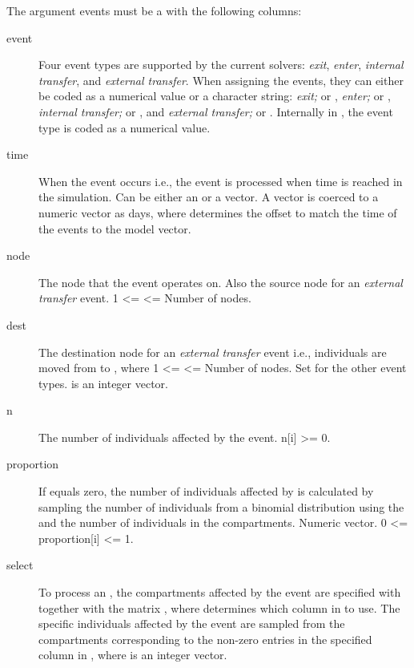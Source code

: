 \documentclass[letterpaper]{book}
\begin{document}
\begin{Description}
The argument events must be a  with the following
columns:
\begin{description}

\item[event] 
Four event types are supported by the current solvers:
\emph{exit}, \emph{enter}, \emph{internal transfer}, and
\emph{external transfer}.  When assigning the events, they can
either be coded as a numerical value or a character string:
\emph{exit;}  or , \emph{enter;} 
or , \emph{internal transfer;}  or
, and \emph{external transfer;}  or
.  Internally in , the event type
is coded as a numerical value.

\item[time] 
When the event occurs i.e., the event is processed when time
is reached in the simulation. Can be either an 
or a  vector.  A  vector is coerced to a
numeric vector as days, where  determines the offset
to match the time of the events to the model 
vector.

\item[node] 
The node that the event operates on. Also the source node for
an \emph{external transfer} event.
1 <=  <= Number of nodes.

\item[dest] 
The destination node for an \emph{external transfer} event
i.e., individuals are moved from  to ,
where 1 <=  <= Number of nodes.  Set  for the other event types.   is an integer
vector.

\item[n] 
The number of individuals affected by the event. n[i] >= 0.

\item[proportion] 
If  equals zero, the number of individuals affected
by  is calculated by sampling the number of
individuals from a binomial distribution using the
 and the number of individuals in the
compartments. Numeric vector.  0 <= proportion[i] <= 1.

\item[select] 
To process an , the compartments affected by
the event are specified with  together with
the matrix , where  determines which
column in  to use.  The specific individuals affected
by the event are sampled from the compartments corresponding
to the non-zero entries in the specified column in , where  is an integer vector.


\end{description}
\end{Description}
\end{document}
